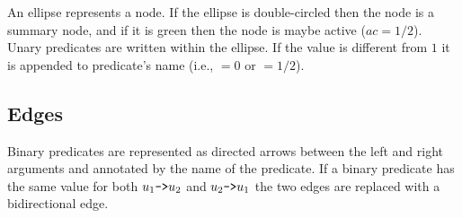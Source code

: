 An ellipse represents a node.  If the ellipse is double-circled
then the node is a summary node, and if it is green then the node
is maybe active ($ac=1/2$).  Unary predicates are written within
the ellipse.  If the value is different from $1$ it is appended to
predicate's name (i.e., $=0$ or $=1/2$).


\subsection{Edges}

Binary predicates are represented as directed arrows between the
left and right arguments and annotated by the name of the
predicate.  If a binary predicate has the same value for both
$u_1\deref u_2$ and $u_2\deref u_1$ the two edges are replaced
with a bidirectional edge.
